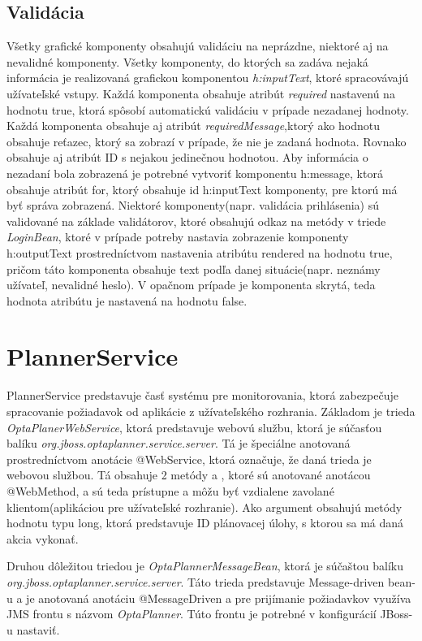 \subsection{Validácia}
Všetky grafické komponenty obsahujú validáciu na neprázdne, niektoré aj na nevalidné komponenty. Všetky komponenty, do ktorých sa zadáva nejaká informácia je realizovaná grafickou komponentou \emph{h:inputText}, ktoré spracovávajú užívateľské vstupy. Každá komponenta obsahuje atribút \emph{required} nastavenú na hodnotu true, ktorá spôsobí automatickú validáciu v prípade nezadanej hodnoty. Každá komponenta obsahuje aj atribút \emph{requiredMessage},ktorý ako hodnotu obsahuje reťazec, ktorý sa zobrazí v prípade, že nie je zadaná hodnota. Rovnako obsahuje aj atribút ID s nejakou jedinečnou hodnotou. Aby informácia o nezadaní bola zobrazená je potrebné vytvoriť komponentu h:message, ktorá obsahuje atribút for, ktorý obsahuje id h:inputText komponenty, pre ktorú má byť správa zobrazená. Niektoré komponenty(napr. validácia prihlásenia) sú validované na základe validátorov, ktoré obsahujú odkaz na metódy v triede \emph{LoginBean}, ktoré v prípade potreby nastavia zobrazenie komponenty h:outputText prostredníctvom nastavenia atribútu rendered na hodnotu true, pričom táto komponenta obsahuje text podľa danej situácie(napr. neznámy užívateľ, nevalidné heslo). V opačnom prípade je komponenta skrytá, teda hodnota atribútu je nastavená na hodnotu false.




\section{PlannerService}\label{plannerapp}
PlannerService predstavuje časť systému pre monitorovania, ktorá zabezpečuje spracovanie požiadavok od aplikácie z užívateľského rozhrania. Základom je trieda \emph{OptaPlanerWebService}, ktorá predstavuje  webovú službu, ktorá je súčasťou balíku \emph{org.jboss.optaplanner.service.server}. Tá je špeciálne anotovaná prostredníctvom anotácie @WebService, ktorá označuje, že daná trieda je webovou službou. Tá obsahuje 2 metódy  a , ktoré sú anotované anotácou @WebMethod, a sú teda prístupne a môžu byť vzdialene zavolané klientom(aplikáciou pre užívateľské rozhranie). Ako argument obsahujú metódy hodnotu typu long, ktorá predstavuje ID plánovacej úlohy, s ktorou sa má daná akcia vykonať.

 Druhou dôležitou triedou
je \emph{OptaPlannerMessageBean}, ktorá je súčaštou balíku \emph{org.jboss.optaplanner.service.server}. Táto trieda predstavuje Message-driven bean-u a je anotovaná anotáciu @MessageDriven a pre prijímanie požiadavkov využíva JMS frontu s názvom \emph{OptaPlanner}. Túto frontu je potrebné v konfigurácií JBoss-u nastaviť.

